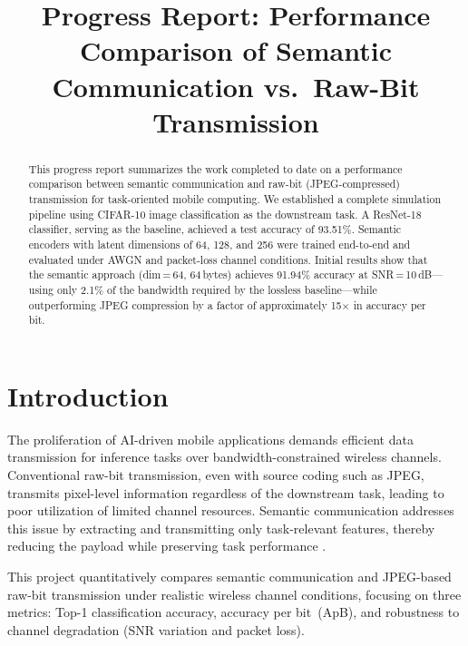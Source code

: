 \documentclass[conference]{IEEEtran}
\begin{document}
\title{Progress Report: Performance Comparison of Semantic Communication vs.\ Raw-Bit Transmission}

\author{
}

\maketitle

\begin{abstract}
This progress report summarizes the work completed to date on a performance
comparison between semantic communication and raw-bit (JPEG-compressed)
transmission for task-oriented mobile computing.
We established a complete simulation pipeline using CIFAR-10 image
classification as the downstream task.
A ResNet-18 classifier, serving as the baseline, achieved a test accuracy of
93.51\%.
Semantic encoders with latent dimensions of 64, 128, and 256 were trained
end-to-end and evaluated under AWGN and packet-loss channel conditions.
Initial results show that the semantic approach (dim\,=\,64, 64\,bytes) achieves
91.94\% accuracy at SNR\,=\,10\,dB---using only 2.1\% of the bandwidth required
by the lossless baseline---while outperforming JPEG compression by a factor of
approximately 15$\times$ in accuracy per bit.
\end{abstract}

\section{Introduction}

The proliferation of AI-driven mobile applications demands efficient data
transmission for inference tasks over bandwidth-constrained wireless channels.
Conventional raw-bit transmission, even with source coding such as JPEG,
transmits pixel-level information regardless of the downstream task, leading to
poor utilization of limited channel resources.
Semantic communication addresses this issue by extracting and transmitting only
task-relevant features, thereby reducing the payload while preserving task
performance \cite{b1,b2}.

This project quantitatively compares semantic communication and JPEG-based
raw-bit transmission under realistic wireless channel conditions, focusing on
three metrics: Top-1 classification accuracy, accuracy per bit~(ApB), and
robustness to channel degradation (SNR variation and packet loss).
\end{document}
